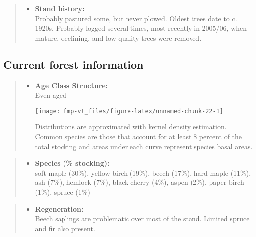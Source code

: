\documentclass[]{tufte-handout}
\providecommand{\tightlist}{%
  \setlength{\itemsep}{0pt}\setlength{\parskip}{0pt}}
\begin{document}
\begin{quote}
\begin{itemize}
\tightlist
\item
  \textbf{Stand history:}\\
  \vspace{2pt} Probably pastured some, but never plowed. Oldest trees
  date to c. 1920s. Probably logged several times, most recently in
  2005/06, when mature, declining, and low quality trees were removed.
\end{itemize}
\end{quote}

\subsection{Current forest
information}\label{current-forest-information-5}

\begin{quote}
\begin{itemize}
\tightlist
\item
  \textbf{Age Class Structure:}\\
  \vspace{2pt} Even-aged\\

  \begin{marginfigure}
  \texttt{[image: fmp-vt\_files/figure-latex/unnamed-chunk-22-1]} \caption[Distributions are approximated with kernel density estimation]{Distributions are approximated with kernel density estimation. Common species are those that account for at least 8 percent of the total stocking and areas under each curve represent species basal areas.}\label{fig:unnamed-chunk-22}
  \end{marginfigure}
\end{itemize}
\end{quote}

\begin{quote}
\begin{itemize}
\tightlist
\item
  \textbf{Species (\% stocking):}\\
  \vspace{2pt} soft maple (30\%), yellow birch (19\%), beech (17\%),
  hard maple (11\%), ash (7\%), hemlock (7\%), black cherry (4\%), aspen
  (2\%), paper birch (1\%), spruce (1\%)
\end{itemize}
\end{quote}

\begin{quote}
\begin{itemize}
\tightlist
\item
  \textbf{Regeneration:}\\
  \vspace{2pt} Beech saplings are problematic over most of the stand.
  Limited spruce and fir also present.
\end{itemize}
\end{quote}
\end{document}
